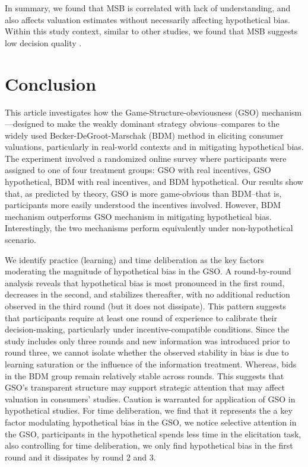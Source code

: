 \documentclass[12pt]{article}
\begin{document}
In summary, we found that MSB is correlated with lack of understanding, and also affects valuation estimates without necessarily affecting hypothetical bias. Within this study context, similar to other studies, we found that MSB suggests low decision quality \citep{charness2013experimental, yu2021multiple}.




\section{Conclusion}
\label{Conclusion}

This article investigates how the Game-Structure-obsviousness (GSO) mechanism—designed to make the weakly dominant strategy obvious--compares to the widely used Becker-DeGroot-Marschak (BDM) method in eliciting consumer valuations, particularly in real-world contexts and in mitigating hypothetical bias. The experiment involved a randomized online survey where participants were assigned to one of four treatment groups: GSO with real incentives, GSO hypothetical, BDM with real incentives, and BDM hypothetical. Our results show that, as predicted by theory, GSO is more game-obvious than BDM--that is, participants more easily understood the incentives involved. However, BDM mechanism outperforms GSO mechanism in mitigating hypothetical bias. Interestingly, the two mechanisms perform equivalently under non-hypothetical scenario.

We identify practice (learning) and time deliberation as the key factors moderating the magnitude of hypothetical bias in the GSO. A round-by-round analysis reveals that hypothetical bias is most pronounced in the first round, decreases in the second, and stabilizes thereafter, with no additional reduction observed in the third round (but it does not dissipate). 
This pattern suggests that participants require at least one round of experience to calibrate their decision-making, particularly under incentive-compatible conditions. Since the study includes only three rounds and new information was introduced prior to round three, we cannot isolate whether the observed stability in bias is due to learning saturation or the influence of the information treatment. Whereas, bids in the BDM group remain relatively stable across rounds. This suggests that GSO’s transparent structure may support strategic attention that may affect valuation in consumers' studies. Caution is warranted for application of GSO in hypothetical studies. For time deliberation, we find that it represents the a key factor modulating hypothetical bias in the GSO, we notice selective attention in the GSO, participants in the hypothetical spends less time in the elicitation task, also controlling for time deliberation, we only find hypothetical bias in the first round and it dissipates by round 2 and 3.
\end{document}
